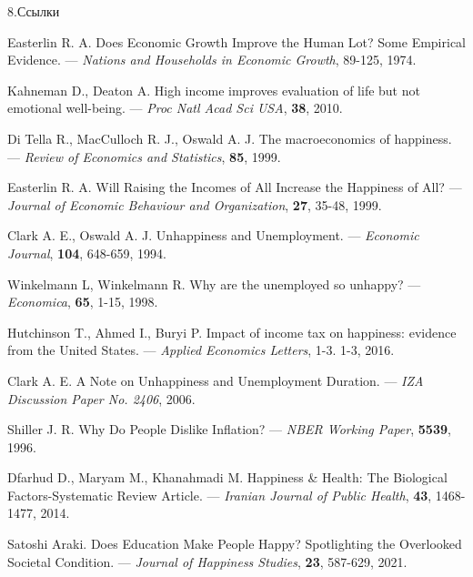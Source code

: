 \documentclass[aspectratio=169]{beamer}
\begin{document}
 \begin{frame}{8.Ссылки}
\tiny
 \begin{thebibliography}{100}
\bibitem{} \label{Easterlin}
            Easterlin R. A.
            Does Economic Growth Improve the Human Lot? Some Empirical Evidence.
            --- \textit{Nations and Households in Economic Growth}, 
            89-125, 1974.

            \bibitem{} \label{KahnemanDeaton}
            Kahneman D., Deaton A. 
            High income improves evaluation of life but not emotional well-being. 
            --- \textit{Proc Natl Acad Sci USA},
            \textbf{38}, 2010.

            \bibitem{} \label{DiTella}
            Di Tella R., MacCulloch R. J., Oswald A. J.
            The macroeconomics of happiness. 
           --- \textit{Review of Economics and Statistics}, 
            \textbf{85}, 1999. 

            \bibitem{} \label{Easterlin2}
            Easterlin R. A.
            Will Raising the Incomes of All Increase the Happiness of All?
            --- \textit{Journal of Economic Behaviour and Organization},
            \textbf{27}, 35-48, 1999. 

            \bibitem{} \label{Clark}
            Clark A. E., Oswald A. J.
            Unhappiness and Unemployment.
            --- \textit{Economic Journal}, 
            \textbf{104}, 648-659, 1994. 

            \bibitem{} \label{Winkelmann}
            Winkelmann L, Winkelmann R.
            Why are the unemployed so unhappy?
            --- \textit{Economica}, 
            \textbf{65}, 1-15, 1998. 

            \bibitem{} \label{tax}
            Hutchinson T., Ahmed I., Buryi P.
            Impact of income tax on happiness: evidence from the United States. 
            --- \textit{Applied Economics Letters}, 1-3.
            1-3, 2016.

            \bibitem{} \label{Clarkunemp}
            Clark A. E.
            A Note on Unhappiness and Unemployment Duration.
            --- \textit{IZA Discussion Paper No. 2406}, 
            2006. 
            
            \bibitem{} \label{Inflation}
            Shiller J. R.
            Why Do People Dislike Inflation?
            --- \textit{NBER Working Paper}, 
            \textbf{5539}, 1996. 

            \bibitem{} \label{medicine}
            Dfarhud D., Maryam M., Khanahmadi M. 
            Happiness & Health: The Biological Factors-Systematic Review Article.
            --- \textit{Iranian Journal of Public Health}, 
            \textbf{43}, 1468-1477, 2014. 

            \bibitem{} \label{Education}
            Satoshi Araki.
            Does Education Make People Happy? Spotlighting the Overlooked Societal Condition.
            --- \textit{Journal of Happiness Studies}, 
            \textbf{23}, 587-629, 2021.
    \end{thebibliography}
 \end{frame}

 
\end{document}
